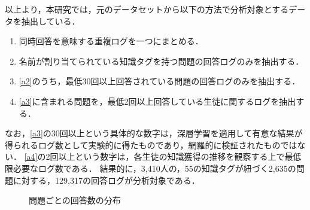 以上より，本研究では，元のデータセットから以下の方法で分析対象とするデータを抽出している．
\begin{enumerate}
	\item 同時回答を意味する重複ログを一つにまとめる．\label{a1}
	\item 名前が割り当てられている知識タグを持つ問題の回答ログのみを抽出する．\label{a2}
	\item \ref{a2}のうち，最低30回以上回答されている問題の回答ログのみを抽出する．\label{a3}
	\item \ref{a3}に含まれる問題を，最低2回以上回答している生徒に関するログを抽出する．\label{a4}
\end{enumerate}

なお，\ref{a3}の30回以上という具体的な数字は，深層学習を適用して有意な結果が得られるログ数として実験的に得たものであり，網羅的に検証されたものではない．
\ref{a4}の2回以上という数字は，各生徒の知識獲得の推移を観察する上で最低限必要なログ数である．
結果的に，3,410人の，55の知識タグが紐づく2,635の問題に対する，129,317の回答ログが分析対象である．

\begin{figure}[t]
\begin{center}
\hspace*{-20pt}
\end{center}
\caption{問題ごとの回答数の分布}
\end{figure}



